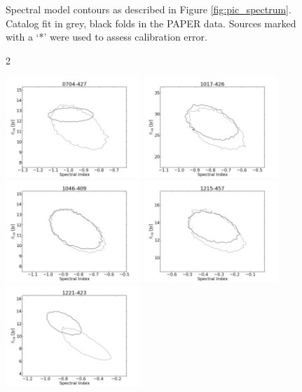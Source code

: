\documentclass[preprint]{aastex}
\begin{document}
\begin{figure}[htbp]
\begin{center}
\end{center}
\caption{Spectral model contours as described in Figure \ref{fig:pic_spectrum}. 
Catalog fit in grey, black folds in the PAPER 
data. Sources marked with a
`*' were used to assess calibration error.
}\label{fig:SI_contour_1}
\end{figure}
\clearpage
\begin{figure}[htbp]2\begin{center}
\includegraphics[width=2in]{plots/0704-427_SI_MCMC.png} %
\includegraphics[width=2in]{plots/1017-426_SI_MCMC.png} %
\includegraphics[width=2in]{plots/1046-409_SI_MCMC.png} %
\includegraphics[width=2in]{plots/1215-457_SI_MCMC.png} %
\includegraphics[width=2in]{plots/1221-423_SI_MCMC.png} %

\end{center}
\end{figure}
\end{document}
